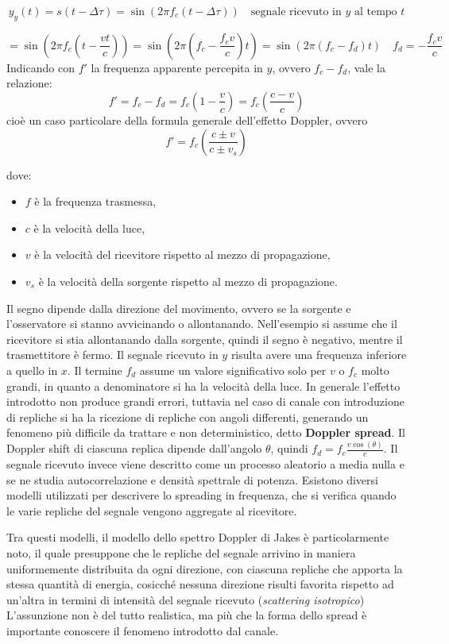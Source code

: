 \[
    y_y(t) = s(t-\Delta \tau) = \sin(2\pi f_c (t-\Delta \tau)) \quad \text{segnale ricevuto in $y$ al tempo $t$}
\]

\[
    = \sin\left(2\pi f_c \left(t - \frac{vt}{c}\right)\right) = \sin\left(2\pi \left(f_c - \frac{f_c v}{c}\right) t\right) = \sin\left(2\pi \left(f_c - f_d \right) t \right) \quad \boxed{f_d = -\frac{f_c v}{c}}
\]
Indicando con $f'$ la frequenza apparente percepita in $y$, ovvero $f_c - f_d$, vale la relazione:
\[
    f' = f_c - f_d = f_c \left(1 - \frac{v}{c}\right) = f_c \left( \frac{c - v}{c} \right)
\]
cioè un caso particolare della formula generale dell'effetto Doppler, ovvero
\[
    f' = f_c \left( \frac{c \pm v}{c \pm v_s} \right)
\]

dove:
\begin{itemize}
    \item $f$ è la frequenza trasmessa,
    \item $c$ è la velocità della luce,
    \item $v$ è la velocità del ricevitore rispetto al mezzo di propagazione,
    \item $v_s$ è la velocità della sorgente rispetto al mezzo di propagazione.
\end{itemize}


Il segno dipende dalla direzione del movimento, ovvero se la sorgente e l'osservatore si stanno avvicinando o allontanando. 
Nell'esempio si assume che il ricevitore si stia allontanando dalla sorgente, quindi il segno è negativo, mentre il trasmettitore è fermo.
Il segnale ricevuto in $y$ risulta avere una frequenza inferiore a quello in $x$.
Il termine $f_d$ assume un valore significativo solo per $v$ o $f_c$ molto grandi, in quanto a denominatore si ha la velocità della luce.
In generale l'effetto introdotto non produce grandi errori, tuttavia nel caso di canale con introduzione di repliche si ha la ricezione di repliche con angoli differenti, generando un fenomeno più difficile da trattare e non deterministico, detto \textbf{Doppler spread}.
Il Doppler shift di ciascuna replica dipende dall'angolo $\theta$, quindi $f_d = f_c \frac{v \cos(\theta)}{c}$. 
Il segnale ricevuto invece viene descritto come un processo aleatorio a media nulla e se ne studia autocorrelazione e densità spettrale di potenza.
Esistono diversi modelli utilizzati per descrivere lo spreading in frequenza,
che si verifica quando le varie repliche del segnale vengono aggregate al ricevitore.

Tra questi modelli, il modello dello spettro Doppler di Jakes è particolarmente noto, il quale presuppone che le repliche del segnale arrivino in maniera uniformemente distribuita da ogni direzione, con ciascuna repliche che apporta la stessa quantità di energia, cosicché nessuna direzione risulti favorita rispetto ad un'altra in termini di intensità del segnale ricevuto (\textit{scattering isotropico})
L'assunzione non è del tutto realistica, ma più che la forma dello spread è importante conoscere il fenomeno introdotto dal canale.

